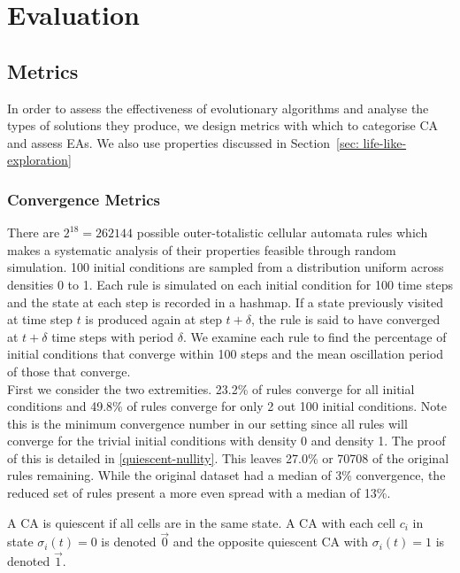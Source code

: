 \chapter{Evaluation} \label{evaluation}

\section{Metrics}
In order to assess the effectiveness of evolutionary algorithms and analyse the types of solutions they produce, we design metrics with which to categorise CA and assess EAs. We also use properties discussed in Section~\ref{sec: life-like-exploration}

\subsection{Convergence Metrics}
There are $2^{18} = 262144$ possible outer-totalistic cellular automata rules which makes a systematic analysis of their properties feasible through random simulation. 100 initial conditions are sampled from a distribution uniform across densities 0 to 1. Each rule is simulated on each initial condition for 100 time steps and the state at each step is recorded in a hashmap. If a state previously visited at time step $t$ is produced again at step $t+\delta$, the rule is said to have converged at $t+\delta$ time steps with period $\delta$. We examine each rule to find the percentage of initial conditions that converge within 100 steps and the mean oscillation period of those that converge.\\

First we consider the two extremities. 23.2\% of rules converge for all initial conditions and 49.8\% of rules converge for only 2 out 100 initial conditions. Note this is the minimum convergence number in our setting since all rules will converge for the trivial initial conditions with density 0 and density 1. The proof of this is detailed in \ref{quiescent-nullity}. This leaves 27.0\% or 70708 of the original rules remaining. While the original dataset had a median of 3\% convergence, the reduced set of rules present a more even spread with a median of 13\%.

\begin{definition}[Quiescence]
A CA is quiescent if all cells are in the same state. A CA with each cell $c_i$ in state $\sigma_i(t) = 0$ is denoted $\vec{0}$ and the opposite quiescent CA with $\sigma_i(t) = 1$ is denoted $\vec{1}$. 
\end{definition}

